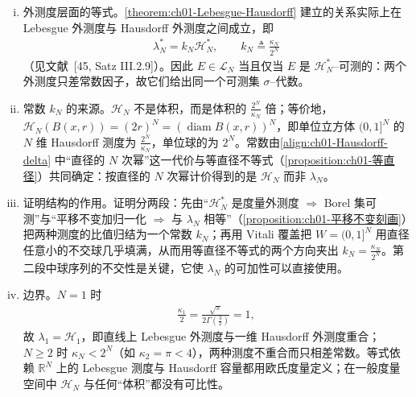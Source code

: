 \documentclass[../../main.tex]{subfiles}%
\begin{document}
\begin{remark}\label{remark:ch01-Lebesgue-Hausdorff}
\begin{enumerate}[(i)]
\item 外测度层面的等式。\cref{theorem:ch01-Lebesgue-Hausdorff} 建立的关系实际上在 Lebesgue 外测度与 Hausdorff 外测度之间成立，即
\begin{align*}
\lambda_N^*=k_N\mathcal{H}_N^*,\qquad k_N\triangleq\frac{\kappa_N}{2^N}
\end{align*}
（见文献~[45, Satz III.2.9]）。因此 $E\in\mathcal{L}_N$ 当且仅当 $E$ 是 $\mathcal{H}_N^*$--可测的：两个外测度只差常数因子，故它们给出同一个可测集 $\sigma$--代数。
\item 常数 $k_N$ 的来源。$\mathcal{H}_N$ 不是体积，而是体积的 $\frac{2^N}{\kappa_N}$ 倍；等价地，$\mathcal{H}_N(B(x,r))=(2r)^N=\left(\operatorname{diam}B(x,r)\right)^N$，即单位立方体 $(0,1]^N$ 的 $N$ 维 Hausdorff 测度为 $\frac{2^N}{\kappa_N}$，单位球的为 $2^N$。常数由\eqref{align:ch01-Hausdorff-delta} 中“直径的 $N$ 次幂”这一代价与等直径不等式（\cref{proposition:ch01-等直径}）共同确定：按直径的 $N$ 次幂计价得到的是 $\mathcal{H}_N$ 而非 $\lambda_N$。
\item 证明结构的作用。证明分两段：先由“$\mathcal{H}_N^*$ 是度量外测度 $\Rightarrow$ Borel 集可测”与“平移不变加归一化 $\Rightarrow$ 与 $\lambda_N$ 相等”（\cref{proposition:ch01-平移不变刻画}）把两种测度的比值归结为一个常数 $k_N$；再用 Vitali 覆盖把 $W=(0,1]^N$ 用直径任意小的不交球几乎填满，从而用等直径不等式的两个方向夹出 $k_N=\frac{\kappa_N}{2^N}$。第二段中球序列的不交性是关键，它使 $\lambda_N$ 的可加性可以直接使用。
\item 边界。$N=1$ 时
\begin{align*}
\frac{\kappa_1}{2}=\frac{\sqrt{\pi}}{2\Gamma\left(\frac{3}{2}\right)}=1,
\end{align*}
故 $\lambda_1=\mathcal{H}_1$，即直线上 Lebesgue 外测度与一维 Hausdorff 外测度重合；$N\geqslant2$ 时 $\kappa_N<2^N$（如 $\kappa_2=\pi<4$），两种测度不重合而只相差常数。等式依赖 $\mathbb{R}^N$ 上的 Lebesgue 测度与 Hausdorff 容量都用欧氏度量定义；在一般度量空间中 $\mathcal{H}_N$ 与任何“体积”都没有可比性。
\end{enumerate}
\end{remark}
\end{document}
